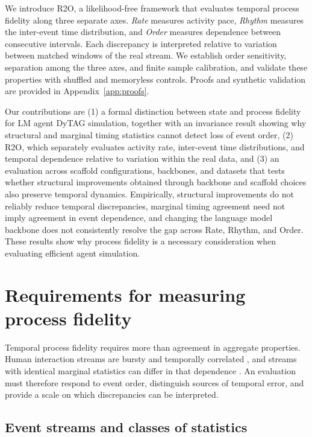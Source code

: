 \documentclass{article}
\begin{document}
We introduce R2O, a likelihood-free framework that evaluates temporal process
fidelity along three separate axes. \emph{Rate} measures activity pace,
\emph{Rhythm} measures the inter-event time distribution, and \emph{Order}
measures dependence between consecutive intervals. Each discrepancy is
interpreted relative to variation between matched windows of the real stream.
We establish order sensitivity, separation among the three axes, and finite
sample calibration, and validate these properties with shuffled and memoryless
controls. Proofs and synthetic validation are provided in
Appendix~\ref{app:proofs}.

Our contributions are (1) a formal distinction between state and process
fidelity for LM agent DyTAG simulation, together with an invariance result
showing why structural and marginal timing statistics cannot detect loss of
event order, (2) R2O, which separately evaluates activity rate, inter-event
time distributions, and temporal dependence relative to variation within the
real data, and (3) an evaluation across scaffold configurations, backbones,
and datasets that tests whether structural improvements obtained through
backbone and scaffold choices also preserve temporal dynamics. Empirically,
structural improvements do not reliably reduce temporal discrepancies,
marginal timing agreement need not imply agreement in event dependence, and
changing the language model backbone does not consistently resolve the gap
across Rate, Rhythm, and Order. These results show why process fidelity is a
necessary consideration when evaluating efficient agent simulation.

\section{Requirements for measuring process fidelity}
\label{sec:requirements}

Temporal process fidelity requires more than agreement in aggregate properties.
Human interaction streams are bursty and temporally correlated
\citep{barabasi2005origin,goh2008burstiness,karsai2018bursty}, and streams with
identical marginal statistics can differ in that dependence
\citep{malmgren2008poissonian,holme2012temporal}. An evaluation must therefore
respond to event order, distinguish sources of temporal error, and provide a
scale on which discrepancies can be interpreted.

\subsection{Event streams and classes of statistics}
\end{document}
